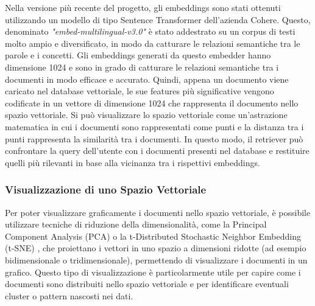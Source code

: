 Nella versione più recente del progetto, gli embeddings sono stati ottenuti utilizzando un modello di tipo Sentence Transformer dell'azienda Cohere. Questo, denominato \textit{"embed-multilingual-v3.0"} \cite{cohereembed} è stato addestrato su un corpus di testi molto ampio e diversificato, in modo da catturare le relazioni semantiche tra le parole e i concetti. Gli embeddings generati da questo embedder hanno dimensione 1024 e sono in grado di catturare le relazioni semantiche tra i documenti in modo efficace e accurato.
Quindi, appena un documento viene caricato nel database vettoriale, le sue features più significative vengono codificate in un vettore di dimensione 1024 che rappresenta il documento nello spazio vettoriale. Si può visualizzare lo spazio vettoriale come un'astrazione matematica in cui i documenti sono rappresentati come punti e la distanza tra i punti rappresenta la similarità tra i documenti. In questo modo, il retriever può confrontare la query dell'utente con i documenti presenti nel database e restituire quelli più rilevanti in base alla vicinanza tra i rispettivi embeddings.

\subsubsection{Visualizzazione di uno Spazio Vettoriale}
Per poter visualizzare graficamente i documenti nello spazio vettoriale, è possibile utilizzare tecniche di riduzione della dimensionalità, come la Principal Component Analysis (PCA) \cite{MACKIEWICZ1993303} o la t-Distributed Stochastic Neighbor Embedding (t-SNE) \cite{cai2022theoreticalfoundationstsnevisualizing,roy2024trustworthydimensionalityreduction}, che proiettano i vettori in uno spazio a dimensioni ridotte (ad esempio bidimensionale o tridimensionale), permettendo di visualizzare i documenti in un grafico.
Questo tipo di visualizzazione è particolarmente utile per capire come i documenti sono distribuiti nello spazio vettoriale e per identificare eventuali cluster o pattern nascosti nei dati.

